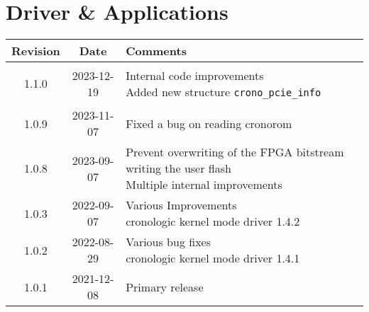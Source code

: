 \section{Driver \& Applications}
\begin{tabularx}{\textwidth}{|c|c|X|}
    \hline
    Revision & Date & Comments\\
    \hline\hline
    \hypertarget{drvrev}{1.1.0} & 2023-12-19 &
    \makecell[l]{
        Internal code improvements\\*
        Added new structure \texttt{crono\_pcie\_info}
    }\\
    \hline
    1.0.9 & 2023-11-07 & Fixed a bug on reading cronorom   \\
    1.0.8 & 2023-09-07 &
    \makecell[l]{
        Prevent overwriting of the FPGA bitstream writing the user flash\\*
        Multiple internal improvements
    }\\
    \hline
    1.0.3 & 2022-09-07 &
    \makecell[l]{
        Various Improvements\\*
        cronologic kernel mode driver 1.4.2
    }\\
    \hline
    1.0.2 & 2022-08-29 &
    \makecell[l]{
        Various bug fixes\\*
        cronologic kernel mode driver 1.4.1
    }\\
    \hline
    1.0.1 & 2021-12-08 & Primary release\\
    \hline
\end{tabularx}